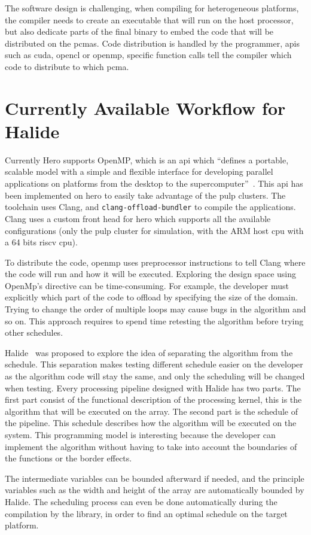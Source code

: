     The software design is challenging, when compiling for heterogeneous platforms,  the compiler needs to create an executable that will run on the host processor, but also dedicate parts of the final binary to embed the code that will be distributed on the \glspl{pcma}. Code distribution is handled by the programmer, \glspl{api} such as \gls{cuda}, \gls{opencl} or \gls{openmp}, specific function calls tell the compiler which code to distribute to which \gls{pcma}.


\section {Currently Available Workflow for Halide}
    Currently Hero supports OpenMP, which is an \gls{api} which ``defines a portable, scalable model with a simple and flexible interface for developing parallel applications on platforms from the desktop to the supercomputer''~\cite{Web:OpenMp}. This \gls{api} has been implemented on \gls{hero} to easily take advantage of the \gls{pulp} clusters. The toolchain uses Clang, and  \verb|clang-offload-bundler| to compile the applications. Clang uses a custom front head for \gls{hero} which supports all the available configurations (only the \gls{pulp} cluster for simulation, with the ARM host \gls{cpu}  with a 64 bits \gls{riscv} \gls{cpu}).

    To distribute the code, \gls{openmp} uses preprocessor instructions to tell Clang where the code will run and how it will be executed. Exploring the design space using OpenMp's directive can be time-consuming. For example, the developer must explicitly which part of the code to offload by specifying the size of the domain. Trying to change the order of multiple loops may cause bugs in the algorithm and so on. This approach requires to spend time retesting the algorithm before trying other schedules.


    Halide~\cite{Art:Halide} was proposed to explore the idea of separating the algorithm from the schedule.
    This separation makes testing different schedule easier on the developer as the algorithm code will stay the same, and only the scheduling will be changed when testing.
    Every processing pipeline designed with Halide has two parts. The first part consist of the functional description of the processing kernel, this is the algorithm that will be executed on the array. The second part is the schedule of the pipeline. This schedule describes how the algorithm will be executed on the system. 
    This programming model is interesting because the developer can implement the algorithm without having to take into account the boundaries of the functions or the border effects. 

    The intermediate variables can be bounded afterward if needed, and the principle variables such as the width and height of the array are automatically bounded by Halide.
    The scheduling process can even be done automatically during the compilation by the library, in order to find an optimal schedule on the target platform.

